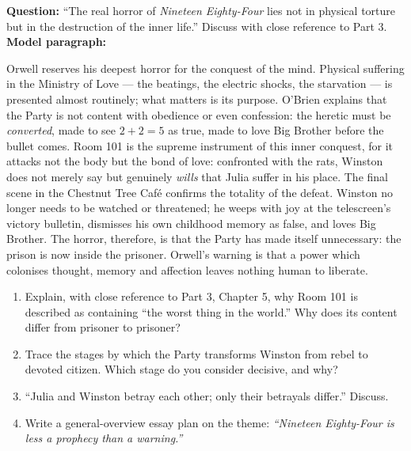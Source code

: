 \documentclass[11pt]{article}
\begin{document}
\begin{exoresolu}
\textbf{Question:} ``The real horror of \emph{Nineteen Eighty-Four} lies not in physical torture but in the destruction of the inner life.'' Discuss with close reference to Part 3.
\tcblower
\textbf{Model paragraph:}\par
Orwell reserves his deepest horror for the conquest of the mind. Physical suffering in the Ministry of Love — the beatings, the electric shocks, the starvation — is presented almost routinely; what matters is its purpose. O'Brien explains that the Party is not content with obedience or even confession: the heretic must be \emph{converted}, made to see $2 + 2 = 5$ as true, made to love Big Brother before the bullet comes. Room 101 is the supreme instrument of this inner conquest, for it attacks not the body but the bond of love: confronted with the rats, Winston does not merely say but genuinely \emph{wills} that Julia suffer in his place. The final scene in the Chestnut Tree Café confirms the totality of the defeat. Winston no longer needs to be watched or threatened; he weeps with joy at the telescreen's victory bulletin, dismisses his own childhood memory as false, and loves Big Brother. The horror, therefore, is that the Party has made itself unnecessary: the prison is now inside the prisoner. Orwell's warning is that a power which colonises thought, memory and affection leaves nothing human to liberate.
\end{exoresolu}

\begin{exercice}[Practice]
\begin{enumerate}
\item Explain, with close reference to Part 3, Chapter 5, why Room 101 is described as containing ``the worst thing in the world.'' Why does its content differ from prisoner to prisoner?
\item Trace the stages by which the Party transforms Winston from rebel to devoted citizen. Which stage do you consider decisive, and why?
\item ``Julia and Winston betray each other; only their betrayals differ.'' Discuss.
\item Write a general-overview essay plan on the theme: \emph{``Nineteen Eighty-Four is less a prophecy than a warning.''}
\end{enumerate}
\end{exercice}
\end{document}
